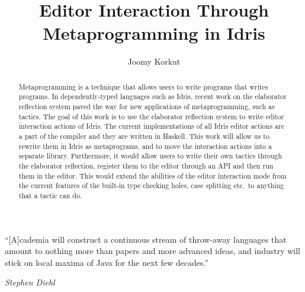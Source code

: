 \documentclass[11pt, ma]{westhesis}
\title{Editor Interaction Through Metaprogramming in Idris}
\author{Joomy Korkut}
\theoremstyle{plain}
\theoremstyle{definition}
\begin{document}
\begin{abstract}
  Metaprogramming is a technique that allows users to write programs that
  writes programs. In dependently-typed languages such as Idris, recent work on
  the elaborator reflection system paved the way for new applications of
  metaprogramming, such as tactics. The goal of this work is to use the
  elaborator reflection system to write editor interaction actions of Idris.
  The current implementations of all Idris editor actions are a part of the
  compiler and they are written in Haskell. This work will allow us to rewrite
  them in Idris as metaprograms, and to move the interaction actions into a
  separate library. Furthermore, it would allow users to write their own
  tactics through the elaborator reflection, register them to the editor
  through an API and then run them in the editor. This would extend the
  abilities of the editor interaction mode from the current features of the
  built-in type checking holes, case splitting etc.\ to anything that a tactic
  can do.
\end{abstract}

\begin{dedication}
  \epigraph{``[A]cademia will construct a continuous stream of throw-away
  languages that amount to nothing more than papers and more advanced ideas,
  and industry will stick on local maxima of Java for the next few
  decades.''}{\textit{Stephen Diehl}}
\end{dedication}

\begin{acknowledgements}
\end{acknowledgements}

\frontmatter
\maketitle
\makeabstract

\tableofcontents

\mainmatter







% 
% 


\end{document}
